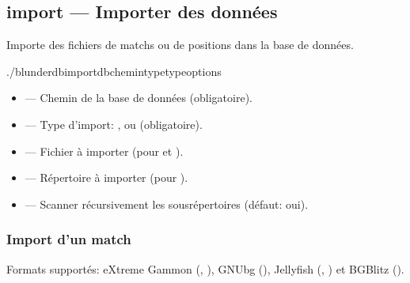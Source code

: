 \documentclass[letterpaper,10pt,french]{sphinxmanual}
\begin{document}
\subsection{import — Importer des données}
\label{\detokenize{cli:import-importer-des-donnees}}
\sphinxAtStartPar
Importe des fichiers de matchs ou de positions dans la base de données.

\begin{sphinxVerbatim}[commandchars=\\\{\}]
./blunderdbimport\PYGZhy{}\PYGZhy{}db\PYGZlt{}chemin\PYGZgt{}\PYGZhy{}\PYGZhy{}type\PYGZlt{}type\PYGZgt{}\PYG{o}{[}options\PYG{o}{]}
\end{sphinxVerbatim}

\sphinxAtStartPar
{}
\begin{itemize}
\item {} 
\sphinxAtStartPar
{} — Chemin de la base de données (obligatoire).

\item {} 
\sphinxAtStartPar
{} — Type d’import: ,  ou  (obligatoire).

\item {} 
\sphinxAtStartPar
{} — Fichier à importer (pour  et ).

\item {} 
\sphinxAtStartPar
{} — Répertoire à importer (pour ).

\item {} 
\sphinxAtStartPar
{} — Scanner récursivement les sous\sphinxhyphen{}répertoires (défaut: oui).

\end{itemize}


\subsubsection{Import d’un match}
\label{\detokenize{cli:import-d-un-match}}
\sphinxAtStartPar
Formats supportés: eXtreme Gammon (, ), GNUbg (),
Jellyfish (, ) et BGBlitz ().
\end{document}
